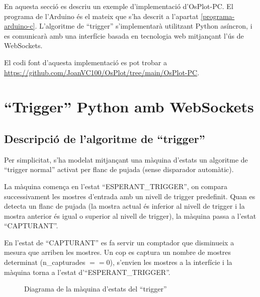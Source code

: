 \documentclass{tfgitic}[2023/06/30]
\begin{document}
En aquesta secció es descriu un exemple d'implementació
d'OsPlot-PC. El programa de l'Arduino és el mateix que s'ha
descrit a l'apartat \ref{programa-arduino-c}. L'algoritme de ``trigger''
s'implementarà utilitzant Python asíncron, i es comunicarà amb una
interfície basada en tecnologia web mitjançant l'ús de WebSockets.

El codi font d'aquesta implementació es pot trobar a
\url{https://github.com/JoanVC100/OsPlot/tree/main/OsPlot-PC}.

\section{``Trigger'' Python amb WebSockets}

\subsection{Descripció de l'algoritme de ``trigger''}

Per simplicitat, s'ha modelat mitjançant una màquina d'estats
un algoritme de ``trigger normal'' activat per flanc de pujada (sense disparador automàtic).

La màquina comença en l'estat
``ESPERANT\_TRIGGER'', on compara successivament les mostres
d'entrada amb un nivell de trigger predefinit. Quan es detecta
un flanc de pujada (la mostra actual és inferior al nivell de
trigger i la mostra anterior és igual o superior al nivell de
trigger), la màquina passa a l'estat ``CAPTURANT''.

En l'estat de ``CAPTURANT'' es fa servir un comptador
que disminueix a mesura que arriben les mostres. Un cop es captura 
un nombre de mostres determinat (n\_capturades $== 0$), s'envien
les mostres a la interfície i la màquina torna a l'estat
d'``ESPERANT\_TRIGGER''.

\begin{figure}[!hb]
      \centering
      \caption{Diagrama de la màquina d'estats del ``trigger''}
\end{figure}
\end{document}
